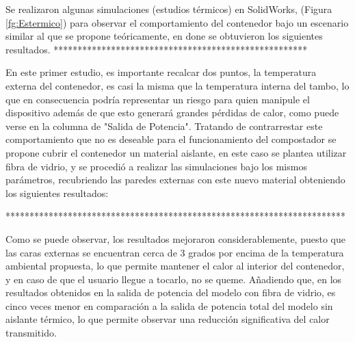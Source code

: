 Se realizaron algunas simulaciones (estudios térmicos) en SolidWorks,  (Figura \ref{fg:Estermico}) para observar el comportamiento del contenedor bajo un escenario similar al que se propone teóricamente, en done se obtuvieron los siguientes resultados.
*****************************************************
\begin{table}
    \centering
    \caption{Caption}
    \label{tab:my_label}
\end{table}
En este primer estudio, es importante recalcar dos puntos, la temperatura externa del contenedor, es casi la misma que la temperatura interna del tambo, lo que en consecuencia podría representar un riesgo para quien manipule el dispositivo además de que esto generará grandes pérdidas de calor, como puede verse en la columna de "Salida de Potencia".
Tratando de contrarrestar este comportamiento que no es deseable para el funcionamiento del compostador se propone cubrir el contenedor un material aislante, en este caso se plantea utilizar fibra de vidrio, y se procedió a realizar  las simulaciones bajo los mismos parámetros, recubriendo las paredes externas con este nuevo material obteniendo los siguientes resultados:

***********************************************************************
\begin{table}
    \centering
    \caption{Caption}
    \label{tab:my_label}
\end{table}

Como se puede observar, los resultados mejoraron considerablemente, puesto que las caras externas se encuentran cerca de 3 grados por encima de la temperatura ambiental propuesta, lo que permite mantener el calor al interior del contenedor, y en caso de que el usuario llegue a tocarlo, no se queme.
Añadiendo que, en los resultados obtenidos en la salida de  potencia  del modelo con fibra de vidrio, es cinco veces menor en comparación a la salida de potencia total del modelo sin aislante térmico, lo que permite observar una reducción significativa del calor transmitido.

